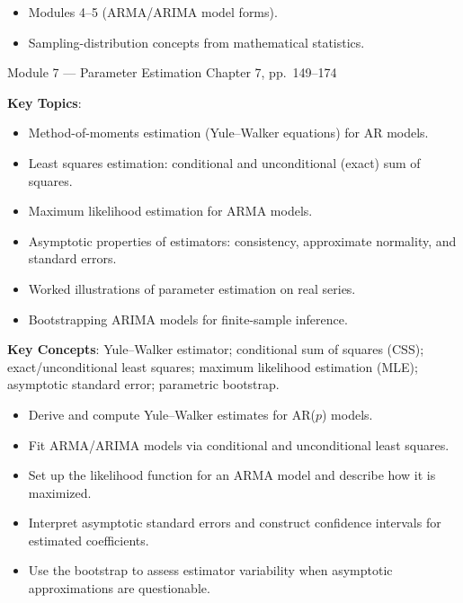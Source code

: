 \documentclass[11pt]{article}
\newcommand{\keytopics}{\textbf{\color{modblue}Key Topics}}
\newcommand{\keyconcepts}{\textbf{\color{modblue}Key Concepts}}
\begin{document}
\begin{prereqs}
\begin{itemize}
  \item Modules 4--5 (ARMA/ARIMA model forms).
  \item Sampling-distribution concepts from mathematical statistics.
\end{itemize}
\end{prereqs}

\vspace{6pt}
\begin{moduletitle}{Module 7 --- Parameter Estimation}
\small Chapter 7, pp.\ 149--174
\end{moduletitle}

\keytopics:
\begin{itemize}
  \item Method-of-moments estimation (Yule--Walker equations) for AR models.
  \item Least squares estimation: conditional and unconditional (exact) sum of squares.
  \item Maximum likelihood estimation for ARMA models.
  \item Asymptotic properties of estimators: consistency, approximate normality, and standard errors.
  \item Worked illustrations of parameter estimation on real series.
  \item Bootstrapping ARIMA models for finite-sample inference.
\end{itemize}

\keyconcepts: Yule--Walker estimator; conditional sum of squares (CSS); exact/unconditional least squares; maximum likelihood estimation (MLE); asymptotic standard error; parametric bootstrap.

\begin{objectives}
\begin{itemize}
  \item Derive and compute Yule--Walker estimates for AR($p$) models.
  \item Fit ARMA/ARIMA models via conditional and unconditional least squares.
  \item Set up the likelihood function for an ARMA model and describe how it is maximized.
  \item Interpret asymptotic standard errors and construct confidence intervals for estimated coefficients.
  \item Use the bootstrap to assess estimator variability when asymptotic approximations are questionable.
\end{itemize}
\end{objectives}
\end{document}
